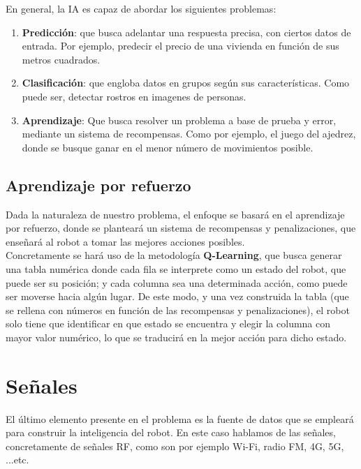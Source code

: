 En general, la \ac{IA} es capaz de abordar los siguientes problemas:

\begin{enumerate}
	\item \textbf{Predicción}: que busca adelantar una respuesta precisa, con ciertos datos de entrada. Por ejemplo, predecir el precio de una vivienda en función de sus metros cuadrados.

	\item \textbf{Clasificación}: que engloba datos en grupos según sus características. Como puede ser, detectar rostros en imagenes de personas.
	
    \item \textbf{Aprendizaje}: Que busca resolver un problema a base de prueba y error, mediante un sistema de recompensas. Como por ejemplo, el juego del ajedrez, donde se busque ganar en el menor número de movimientos posible.
\end{enumerate}

\subsection{Aprendizaje por refuerzo}
\label{subsec:aprendizaje_por_refuerzo}

Dada la naturaleza de nuestro problema, el enfoque se basará en el aprendizaje por refuerzo, donde se planteará un sistema de recompensas y penalizaciones, que enseñará al robot a tomar las mejores acciones posibles.\\

Concretamente se hará uso de la metodología \textbf{Q-Learning}, que busca generar una tabla numérica donde cada fila se interprete como un estado del robot, que puede ser su posición; y cada columna sea una determinada acción, como puede ser moverse hacia algún lugar. De este modo, y una vez construida la tabla (que se rellena con números en función de las recompensas y penalizaciones), el robot solo tiene que identificar en que estado se encuentra y elegir la columna con mayor valor numérico, lo que se traducirá en la mejor acción para dicho estado.

\section{Señales}
\label{subsec:señales}

El último elemento presente en el problema es la fuente de datos que se empleará para construir la inteligencia del robot. En este caso hablamos de las señales, concretamente de señales \ac{RF}, como son por ejemplo Wi-Fi, radio FM, 4G, 5G, ...etc.\\


